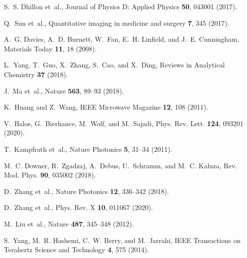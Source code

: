 \documentclass[aps,prl,twocolumn,superscriptaddress]{revtex4-1}
\begin{document}


% 

\providecommand{\noopsort}[1]{}\providecommand{\singleletter}[1]{#1}%
\begin{thebibliography}{10}

S.~S. Dhillon et~al.,
\newblock Journal of Physics D: Applied Physics {\bf 50}, 043001 (2017).

Q.~Sun et~al.,
\newblock Quantitative imaging in medicine and surgery {\bf 7}, 345 (2017).

A.~G. Davies, A.~D. Burnett, W.~Fan, E.~H. Linfield, and J.~E. Cunningham,
\newblock Materials Today {\bf 11}, 18 (2008).

L.~Yang, T.~Guo, X.~Zhang, S.~Cao, and X.~Ding,
\newblock Reviews in Analytical Chemistry {\bf 37} (2018).

J.~Ma et~al.,
\newblock Nature {\bf 563}, 89–93 (2018).

K.~{Huang} and Z.~{Wang},
\newblock IEEE Microwave Magazine {\bf 12}, 108 (2011).

V.~Balos, G.~Bierhance, M.~Wolf, and M.~Sajadi,
\newblock Phys. Rev. Lett. {\bf 124}, 093201 (2020).

T.~Kampfrath et~al.,
\newblock Nature Photonics {\bf 5}, 31–34 (2011).

M.~C. Downer, R.~Zgadzaj, A.~Debus, U.~Schramm, and M.~C. Kaluza,
\newblock Rev. Mod. Phys. {\bf 90}, 035002 (2018).

D.~Zhang et~al.,
\newblock Nature Photonics {\bf 12}, 336–342 (2018).

D.~Zhang et~al.,
\newblock Phys. Rev. X {\bf 10}, 011067 (2020).

M.~Liu et~al.,
\newblock Nature {\bf 487}, 345–348 (2012).

S.~{Yang}, M.~R. {Hashemi}, C.~W. {Berry}, and M.~{Jarrahi},
\newblock IEEE Transactions on Terahertz Science and Technology {\bf 4}, 575
  (2014).


\end{thebibliography}
\end{document}
